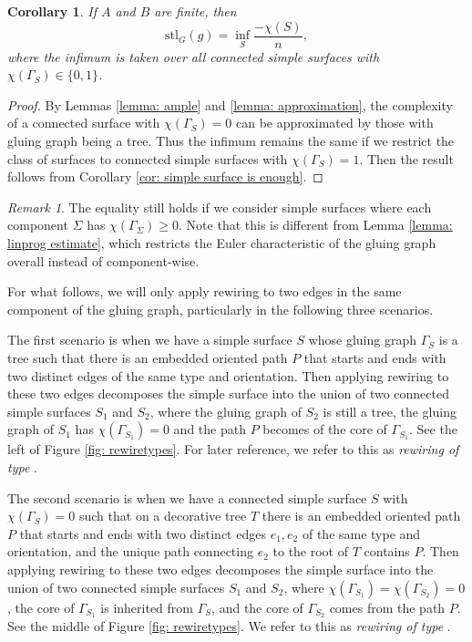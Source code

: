\documentclass{amsart}
\newtheorem{corollary}[theorem]{Corollary}
\theoremstyle{definition}
\numberwithin{equation}{section}
\theoremstyle{theorem}
\theoremstyle{remark}
\newtheorem{remark}[theorem]{Remark}
\def\stl{\mathrm{stl}}
\newcommand{\RNum}[1]{\uppercase\expandafter{\romannumeral #1\relax}}
\begin{document}
	\begin{corollary}\label{cor: simple with chi01}
		If $A$ and $B$ are finite, then 
		$$\stl_G(g)=\inf_S \frac{-\chi(S)}{n},$$
		where the infimum is taken over all connected simple surfaces with $\chi(\Gamma_S)\in\{0,1\}$.
	\end{corollary}
	\begin{proof}
		By Lemmas \ref{lemma: ample} and \ref{lemma: approximation}, the complexity of a connected surface with $\chi(\Gamma_S)=0$ can be approximated by those with gluing graph being a tree. Thus the infimum remains the same if we restrict the class of surfaces to connected simple surfaces with $\chi(\Gamma_S)=1$. Then the result follows from Corollary \ref{cor: simple surface is enough}.
	\end{proof}
	
	\begin{remark}
	    The equality still holds if we consider simple surfaces where each component $\Sigma$ has $\chi(\Gamma_\Sigma)\ge0$. Note that this is different from Lemma \ref{lemma: linprog estimate}, which restricts the Euler characteristic of the gluing graph overall instead of component-wise.
	\end{remark}
	
	
	For what follows, we will only apply rewiring to two edges in the same component of the gluing graph, particularly in the following three scenarios.
	
	The first scenario is when we have a simple surface $S$ whose gluing graph $\Gamma_S$ is a tree such that there is an embedded oriented path $P$ that starts and ends with two distinct edges of the same type and orientation. 
	Then applying rewiring to these two edges decomposes the simple surface into the union of two connected simple surfaces $S_1$ and $S_2$, where the gluing graph of $S_2$ is still a tree, the gluing graph of $S_1$ has $\chi(\Gamma_{S_1})=0$ and the path $P$ becomes of the core of $\Gamma_{S_1}$. See the left of Figure \ref{fig: rewiretypes}. For later reference, we refer to this as \emph{rewiring of type \RNum{1}}.
	
	The second scenario is when we have a connected simple surface $S$ with $\chi(\Gamma_S)=0$ such that on a decorative tree $T$ there is an embedded oriented path $P$ that starts and ends with two distinct edges $e_1,e_2$ of the same type and orientation, and the unique path connecting $e_2$ to the root of $T$ contains $P$. Then applying rewiring to these two edges decomposes the simple surface into the union of two connected simple surfaces $S_1$ and $S_2$, where $\chi(\Gamma_{S_1})=\chi(\Gamma_{S_2})=0$, the core of $\Gamma_{S_1}$ is inherited from $\Gamma_S$, and the core of $\Gamma_{S_2}$ comes from the path $P$. See the middle of Figure \ref{fig: rewiretypes}. We refer to this as \emph{rewiring of type \RNum{2}}.
	
\end{document}
